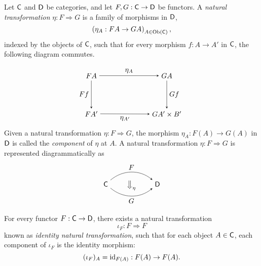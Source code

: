 \begin{definition}
  Let $\mathsf{C}$ and $\mathsf{D}$ be categories, and let $F, G : \mathsf{C} \to \mathsf{D}$ be functors. A \emph{natural transformation} $\eta : F \Rightarrow G$ is a family of morphisms in $\mathsf{D}$,
\[
\left( \eta_A : FA \to GA \right)_{A \in \mathrm{Ob}(\mathsf{C})},
\]
indexed by the objects of $\mathsf{C}$, such that for every morphism $f : A \to A'$ in $\mathsf{C}$, the following diagram commutes. 

\[
\begin{tikzpicture}
  \matrix (m) [matrix of math nodes,row sep=4em,column sep=7em,minimum width=2em]
  {
   FA  & GA  \\
    FA'  & GA' \times B'  \\
  };
  \path[-stealth]
    (m-1-1) edge  node [above] {$\eta_A$} (m-1-2)
    (m-2-1) edge  node [below] {$\eta_{A'}$} (m-2-2)
    (m-1-1) edge  node [left] {$Ff$} (m-2-1)
    (m-1-2) edge  node [right] {$Gf$} (m-2-2)
    ;
\end{tikzpicture}
\]
Given a natural transformation \(\eta : F \Rightarrow G\), the morphism \(\eta_A : F(A) \to G(A)\) in \(\mathsf{D}\) is called the \emph{component} of \(\eta\) at \(A\).
A natural transformation $\eta : F \Rightarrow G$ is represented diagrammatically as 
\[
\begin{tikzpicture}
  \matrix (m) [matrix of math nodes,row sep=0.4em,column sep=2em,minimum width=1em]
  {
   \catC   & \big\Downarrow_{\eta} & \catD \\
  };
  \path[-stealth]
    (m-1-1) edge [bend left=40] node [above] {$F$} (m-1-3)
    (m-1-1) edge [bend left=-40] node [below] {$G$} (m-1-3)
    ;
\end{tikzpicture}
\]

\end{definition}


\begin{example}
  For every functor $F : \mathsf{C} \to \mathsf{D}$, there exists a natural transformation
  \[
    \iota_F : F \Rightarrow F
  \]
  known as  \emph{identity natural transformation},  such that for each object $A \in \mathsf{C}$, each component of $\iota_F$ is the identity morphism:
  \[
    (\iota_F)_A = \mathrm{id}_{F(A)} : F(A) \to F(A).
    \] 
\end{example}

